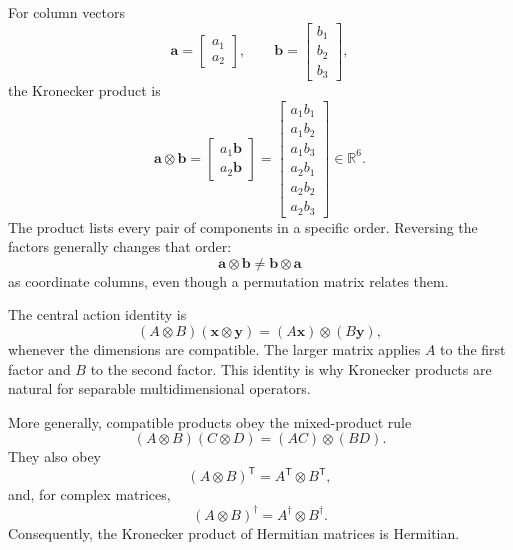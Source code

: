 For column vectors
\begin{equation}
  \mathbf a=
  \begin{bmatrix}a_1\\a_2\end{bmatrix},
  \qquad
  \mathbf b=
  \begin{bmatrix}b_1\\b_2\\b_3\end{bmatrix},
\end{equation}
the Kronecker product is
\begin{equation}
  \mathbf a\otimes\mathbf b
  =
  \begin{bmatrix}
    a_1\mathbf b\\
    a_2\mathbf b
  \end{bmatrix}
  =
  \begin{bmatrix}
    a_1b_1\\a_1b_2\\a_1b_3\\
    a_2b_1\\a_2b_2\\a_2b_3
  \end{bmatrix}
  \in\mathbb R^6.
\end{equation}
The product lists every pair of components in a specific order. Reversing the
factors generally changes that order:
\begin{equation}
  \mathbf a\otimes\mathbf b
  \neq
  \mathbf b\otimes\mathbf a
\end{equation}
as coordinate columns, even though a permutation matrix relates them.

The central action identity is
\begin{equation}
  (A\otimes B)(\mathbf x\otimes\mathbf y)
  =(A\mathbf x)\otimes(B\mathbf y),
\end{equation}
whenever the dimensions are compatible. The larger matrix applies \(A\) to the
first factor and \(B\) to the second factor. This identity is why Kronecker
products are natural for separable multidimensional operators.

More generally, compatible products obey the mixed-product rule
\begin{equation}
  (A\otimes B)(C\otimes D)
  =(AC)\otimes(BD).
\end{equation}
They also obey
\begin{equation}
  (A\otimes B)^{\mathsf T}=A^{\mathsf T}\otimes B^{\mathsf T},
\end{equation}
and, for complex matrices,
\begin{equation}
  (A\otimes B)^{\dagger}=A^{\dagger}\otimes B^{\dagger}.
\end{equation}
Consequently, the Kronecker product of Hermitian matrices is Hermitian.

